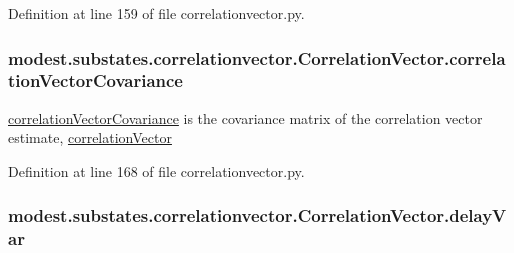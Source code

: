 Definition at line 159 of file correlationvector.\+py.

\subsubsection[{\texorpdfstring{correlation\+Vector\+Covariance}{correlationVectorCovariance}}]{\setlength{\rightskip}{0pt plus 5cm}modest.\+substates.\+correlationvector.\+Correlation\+Vector.\+correlation\+Vector\+Covariance}\hypertarget{classmodest_1_1substates_1_1correlationvector_1_1CorrelationVector_a03bf36ec74d2fa70eeec14da348bec0c}{}\label{classmodest_1_1substates_1_1correlationvector_1_1CorrelationVector_a03bf36ec74d2fa70eeec14da348bec0c}


\hyperlink{classmodest_1_1substates_1_1correlationvector_1_1CorrelationVector_a03bf36ec74d2fa70eeec14da348bec0c}{correlation\+Vector\+Covariance} is the covariance matrix of the correlation vector estimate, \hyperlink{classmodest_1_1substates_1_1correlationvector_1_1CorrelationVector_a81da583ee9077067b6aaa354fd8a8c49}{correlation\+Vector} 



Definition at line 168 of file correlationvector.\+py.

\subsubsection[{\texorpdfstring{delay\+Var}{delayVar}}]{\setlength{\rightskip}{0pt plus 5cm}modest.\+substates.\+correlationvector.\+Correlation\+Vector.\+delay\+Var}\hypertarget{classmodest_1_1substates_1_1correlationvector_1_1CorrelationVector_ab0c6ffbea793ae20593e85d033341595}{}\label{classmodest_1_1substates_1_1correlationvector_1_1CorrelationVector_ab0c6ffbea793ae20593e85d033341595}


